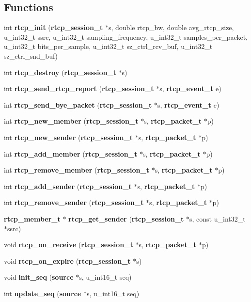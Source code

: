 \subsection*{Functions}
\begin{CompactItemize}
\item 
int {\bf rtcp\_\-init} ({\bf rtcp\_\-session\_\-t} $\ast$s, double rtcp\_\-bw, double avg\_\-rtcp\_\-size, u\_\-int32\_\-t ssrc, u\_\-int32\_\-t sampling\_\-frequency, u\_\-int32\_\-t samples\_\-per\_\-packet, u\_\-int32\_\-t bits\_\-per\_\-sample, u\_\-int32\_\-t sz\_\-ctrl\_\-rcv\_\-buf, u\_\-int32\_\-t sz\_\-ctrl\_\-snd\_\-buf)
\item 
int {\bf rtcp\_\-destroy} ({\bf rtcp\_\-session\_\-t} $\ast$s)
\item 
int {\bf rtcp\_\-send\_\-rtcp\_\-report} ({\bf rtcp\_\-session\_\-t} $\ast$s, {\bf rtcp\_\-event\_\-t} e)
\item 
int {\bf rtcp\_\-send\_\-bye\_\-packet} ({\bf rtcp\_\-session\_\-t} $\ast$s, {\bf rtcp\_\-event\_\-t} e)
\item 
int {\bf rtcp\_\-new\_\-member} ({\bf rtcp\_\-session\_\-t} $\ast$s, {\bf rtcp\_\-packet\_\-t} $\ast$p)
\item 
int {\bf rtcp\_\-new\_\-sender} ({\bf rtcp\_\-session\_\-t} $\ast$s, {\bf rtcp\_\-packet\_\-t} $\ast$p)
\item 
int {\bf rtcp\_\-add\_\-member} ({\bf rtcp\_\-session\_\-t} $\ast$s, {\bf rtcp\_\-packet\_\-t} $\ast$p)
\item 
int {\bf rtcp\_\-remove\_\-member} ({\bf rtcp\_\-session\_\-t} $\ast$s, {\bf rtcp\_\-packet\_\-t} $\ast$p)
\item 
int {\bf rtcp\_\-add\_\-sender} ({\bf rtcp\_\-session\_\-t} $\ast$s, {\bf rtcp\_\-packet\_\-t} $\ast$p)
\item 
int {\bf rtcp\_\-remove\_\-sender} ({\bf rtcp\_\-session\_\-t} $\ast$s, {\bf rtcp\_\-packet\_\-t} $\ast$p)
\item 
{\bf rtcp\_\-member\_\-t} $\ast$ {\bf rtcp\_\-get\_\-sender} ({\bf rtcp\_\-session\_\-t} $\ast$s, const u\_\-int32\_\-t $\ast$ssrc)
\item 
void {\bf rtcp\_\-on\_\-receive} ({\bf rtcp\_\-session\_\-t} $\ast$s, {\bf rtcp\_\-packet\_\-t} $\ast$p)
\item 
void {\bf rtcp\_\-on\_\-expire} ({\bf rtcp\_\-session\_\-t} $\ast$s)
\item 
void {\bf init\_\-seq} ({\bf source} $\ast$s, u\_\-int16\_\-t seq)
\item 
int {\bf update\_\-seq} ({\bf source} $\ast$s, u\_\-int16\_\-t seq)

\end{CompactItemize}
